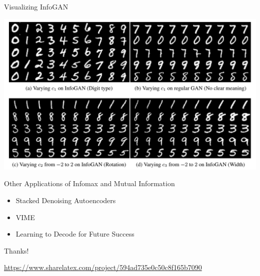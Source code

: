 \documentclass{beamer}
\begin{document}
\begin{frame}{Visualizing InfoGAN}{}

\begin{center}
    \includegraphics[height=0.6\textheight]{infogan_viz}
\end{center}

\end{frame}

\begin{frame}{Other Applications of Infomax and Mutual Information}{}

\begin{itemize}
  \item Stacked Denoising Autoencoders
  \item VIME
  \item Learning to Decode for Future Success
\end{itemize}

\end{frame}

\begin{frame}{Thanks!}{}

    \url{https://www.sharelatex.com/project/594ad735e0c50c8f165b7090}

\end{frame}
\end{document}
